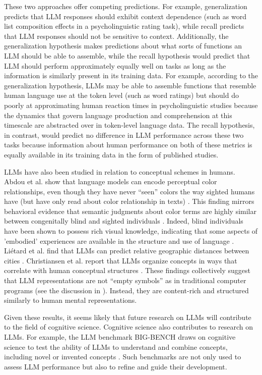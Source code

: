 These two approaches offer competing predictions. For example, generalization predicts that LLM responses should exhibit context dependence (such as word list composition effects in a psycholinguistic rating task), while recall predicts that LLM responses should not be sensitive to context. Additionally, the generalization hypothesis makes predictions about what sorts of functions an LLM should be able to assemble, while the recall hypothesis would predict that LLM should perform approximately equally well on tasks as long as the information is similarly present in its training data. For example, according to the generalization hypothesis, LLMs may be able to assemble functions that resemble human language use at the token level (such as word ratings) but should do poorly at approximating human reaction times in psycholinguistic studies because the dynamics that govern language production and comprehension at this timescale are abstracted over in token-level language data. The recall hypothesis, in contrast, would predict no difference in LLM performance across these two tasks because information about human performance on both of these metrics is equally available in its training data in the form of published studies.

LLMs have also been studied in relation to conceptual schemes in humans. Abdou et al. show that language models can encode perceptual color relationships, even though they have never ``seen'' colors the way sighted humans have (but have only read about color relationship in texts) \cite{abdou2021can}. This finding mirrors behavioral evidence that semantic judgments about color terms are highly similar between congenitally blind and sighted individuals \cite{marmor1978age, saysani2018colour}. Indeed, blind individuals have been shown to possess rich visual knowledge, indicating that some aspects of 'embodied' experiences are available in the structure and use of language \cite{kim2019knowledge, liu2025learning}. Liétard et al. find that LLMs can predict relative geographic distances between cities \cite{lietard2021do}. Christiansen et al. report that LLMs organize concepts in ways that correlate with human conceptual structures \cite{christiansen2023large}. These findings collectively suggest that LLM representations are not ``empty symbols'' as in traditional computer programs (see the discussion in ). Instead, they are content-rich and structured similarly to human mental representations.

Given these results, it seems likely that future research on LLMs will contribute to the field of cognitive science. Cognitive science also contributes to research on LLMs. For example, the LLM benchmark BIG-BENCH draws on cognitive science to test the ability of LLMs to understand and combine concepts, including novel or invented concepts \cite{srivastava2022beyond}. Such benchmarks are not only used to assess LLM performance but also to refine and guide their development.

